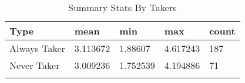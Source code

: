 \begin{table}[H] \centering
{}

\caption{Summary Stats By Takers}
\begin{tabularx}{15cm}{lCCCC}

\toprule
{Type}&{mean}&{min}&{max}&{count} \tabularnewline
\midrule\addlinespace[1.5ex]
Always Taker&3.113672&1.88607&4.617243&187 \tabularnewline
Never Taker&3.009236&1.752539&4.194886&71 \tabularnewline
\bottomrule \addlinespace[1.5ex]

\end{tabularx}
\end{table}
